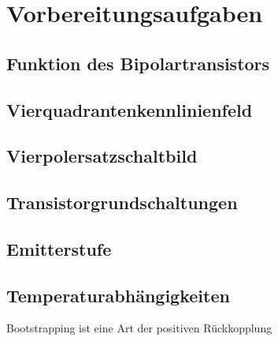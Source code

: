 \documentclass[a4paper, 12pt]{article}
\begin{document}
  
  \clearpage
  \setcounter{page}{1}

\section{Vorbereitungsaufgaben}

\subsection{Funktion des Bipolartransistors}


\subsection{Vierquadrantenkennlinienfeld}


\subsection{Vierpolersatzschaltbild}


\subsection{Transistorgrundschaltungen}


\subsection{Emitterstufe}


\subsection{Temperaturabhängigkeiten}


Bootstrapping ist eine Art der positiven Rückkopplung
\end{document}
